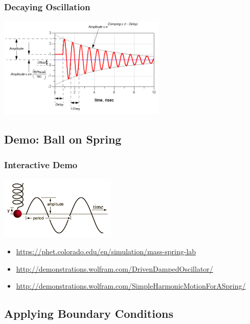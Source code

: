 \documentclass[pdf,hideothersubsections]{beamer}
\begin{document}
\begin{frame}
\frametitle{Decaying Oscillation}

\centering
\includegraphics[width=8cm]{damped_sine.png}

\end{frame}


\subsection{Demo: Ball on Spring}
\begin{frame}
\frametitle{Interactive Demo}
\centering
\includegraphics[height=3cm]{2015416-94550395-2754-sshm.png}
\begin{itemize}
\item \url{https://phet.colorado.edu/en/simulation/mass-spring-lab}
\item \url{http://demonstrations.wolfram.com/DrivenDampedOscillator/}
\item \url{http://demonstrations.wolfram.com/SimpleHarmonicMotionForASpring/}
\end{itemize}
\end{frame}


\subsection{Applying Boundary Conditions}

\end{document}
